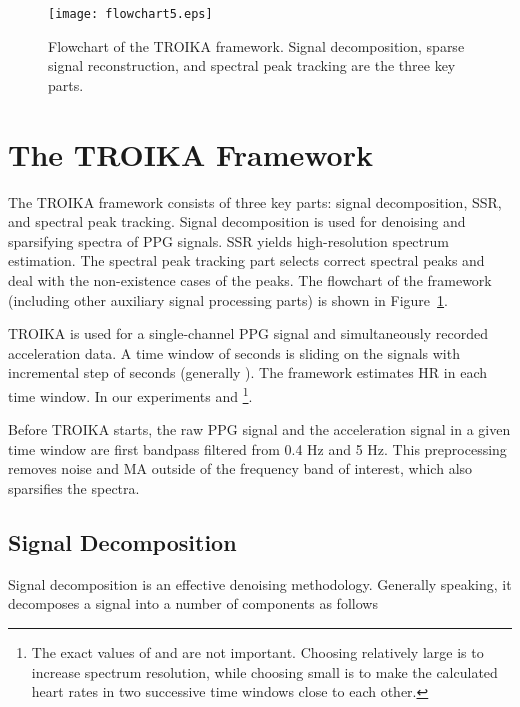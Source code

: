 \documentclass[10pt,twocolumn]{IEEEtran}
\begin{document}
\begin{figure}[t]
\centering
\texttt{[image: flowchart5.eps]}
\caption{Flowchart of the TROIKA framework. Signal decomposition, sparse signal reconstruction, and spectral peak tracking are the three key parts.}
\label{fig:framework}
\end{figure}









\section{The TROIKA Framework}
\label{sec:TROIKA}

The TROIKA framework consists of three key parts: signal decomposition, SSR, and spectral peak tracking. Signal decomposition is used for denoising and sparsifying spectra of PPG signals. SSR yields high-resolution spectrum estimation. The spectral peak tracking part selects correct spectral peaks and deal with the non-existence cases of the peaks. The flowchart of the framework (including other auxiliary signal processing parts) is shown in Figure~\ref{fig:framework}.


TROIKA is used for a single-channel PPG signal and simultaneously recorded acceleration data. A time window of  seconds is sliding on the  signals with incremental step of  seconds (generally ). The framework estimates HR in each time window. In our experiments  and  \footnote{The exact values of  and  are not important. Choosing relatively large  is to increase spectrum resolution, while choosing small  is to make the calculated heart rates in two successive time windows close to each other.}.

Before TROIKA starts, the raw PPG signal and the acceleration signal in a given time window are first bandpass filtered from 0.4 Hz and 5 Hz. This preprocessing removes noise and MA outside of the frequency band of interest, which also sparsifies the spectra.




\subsection{Signal Decomposition}

Signal decomposition is an effective denoising methodology. Generally speaking, it decomposes a signal  into a number of components as follows
\end{document}
